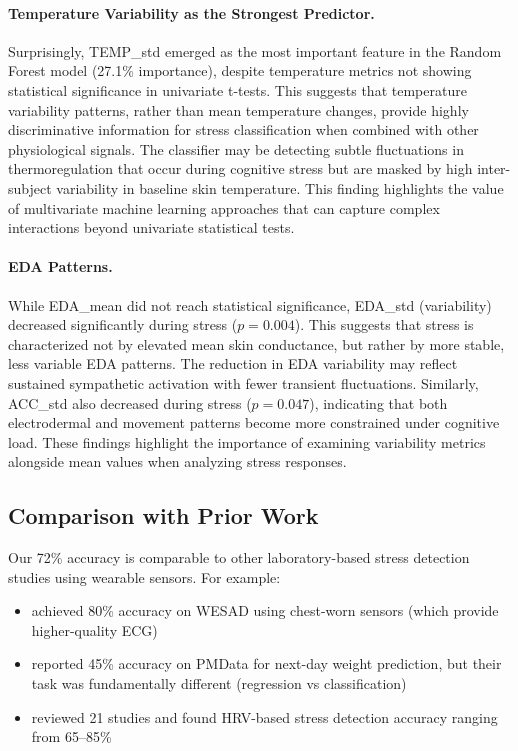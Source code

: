 \documentclass[12pt,letterpaper]{article}
\begin{document}
\paragraph{Temperature Variability as the Strongest Predictor.} Surprisingly, TEMP\_std emerged as the most important feature in the Random Forest model (27.1\% importance), despite temperature metrics not showing statistical significance in univariate t-tests. This suggests that temperature variability patterns, rather than mean temperature changes, provide highly discriminative information for stress classification when combined with other physiological signals. The classifier may be detecting subtle fluctuations in thermoregulation that occur during cognitive stress but are masked by high inter-subject variability in baseline skin temperature. This finding highlights the value of multivariate machine learning approaches that can capture complex interactions beyond univariate statistical tests.

\paragraph{EDA Patterns.} While EDA\_mean did not reach statistical significance, EDA\_std (variability) decreased significantly during stress ($p = 0.004$). This suggests that stress is characterized not by elevated mean skin conductance, but rather by more stable, less variable EDA patterns. The reduction in EDA variability may reflect sustained sympathetic activation with fewer transient fluctuations. Similarly, ACC\_std also decreased during stress ($p = 0.047$), indicating that both electrodermal and movement patterns become more constrained under cognitive load. These findings highlight the importance of examining variability metrics alongside mean values when analyzing stress responses.

\subsection{Comparison with Prior Work}

Our 72\% accuracy is comparable to other laboratory-based stress detection studies using wearable sensors. For example:
\begin{itemize}
    \item \cite{schmidt2018wesad} achieved 80\% accuracy on WESAD using chest-worn sensors (which provide higher-quality ECG)
    \item \cite{thambawita2020pmdata} reported 45\% accuracy on PMData for next-day weight prediction, but their task was fundamentally different (regression vs classification)
    \item \cite{hickey2021smart} reviewed 21 studies and found HRV-based stress detection accuracy ranging from 65--85\%
\end{itemize}
\end{document}
